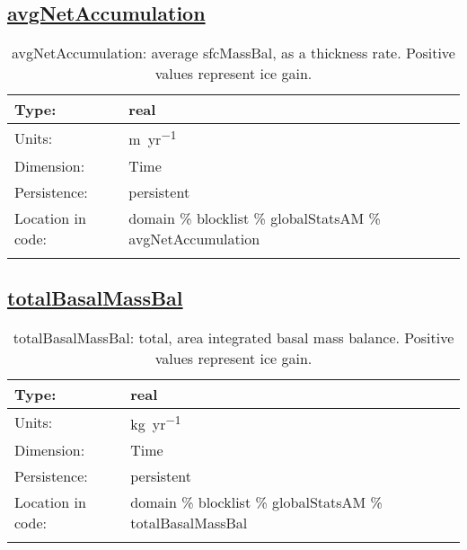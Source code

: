 \subsection[avgNetAccumulation]{\hyperref[sec:var_tab_globalStatsAM]{avgNetAccumulation}}
\label{subsec:var_sec_globalStatsAM_avgNetAccumulation}
\begin{center}
\begin{longtable}{| p{2.0in} | p{4.0in} |}
        \hline 
        Type: & real \\
        \hline 
        Units: & \si{m.yr^{-1}} \\
        \hline 
        Dimension: & Time \\
        \hline 
        Persistence: & persistent \\
        \hline 
         Location in code: & domain \% blocklist \% globalStatsAM \% avgNetAccumulation \\
         \hline 
    \caption{avgNetAccumulation: average sfcMassBal, as a thickness rate. Positive values represent ice gain.}
\end{longtable}
\end{center}
\subsection[totalBasalMassBal]{\hyperref[sec:var_tab_globalStatsAM]{totalBasalMassBal}}
\label{subsec:var_sec_globalStatsAM_totalBasalMassBal}
\begin{center}
\begin{longtable}{| p{2.0in} | p{4.0in} |}
        \hline 
        Type: & real \\
        \hline 
        Units: & \si{kg.yr^{-1}} \\
        \hline 
        Dimension: & Time \\
        \hline 
        Persistence: & persistent \\
        \hline 
         Location in code: & domain \% blocklist \% globalStatsAM \% totalBasalMassBal \\
         \hline 
    \caption{totalBasalMassBal: total, area integrated basal mass balance. Positive values represent ice gain.}
\end{longtable}
\end{center}
